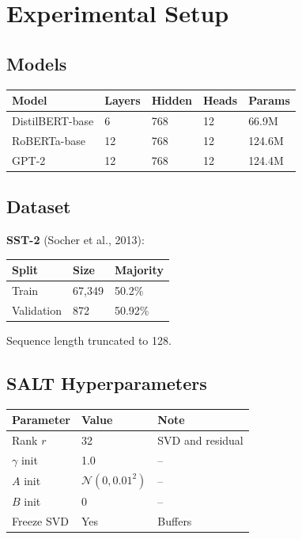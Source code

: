 
\section{Experimental Setup}

\subsection{Models}

\begin{table}[H]
\centering
\small
\begin{tabular}{lllll}
\toprule
\textbf{Model} & \textbf{Layers} & \textbf{Hidden} & \textbf{Heads} & \textbf{Params} \\
\midrule
DistilBERT-base & 6 & 768 & 12 & 66.9M \\
RoBERTa-base & 12 & 768 & 12 & 124.6M \\
GPT-2 & 12 & 768 & 12 & 124.4M \\
\bottomrule
\end{tabular}
\end{table}

\subsection{Dataset}

\textbf{SST-2} (Socher et al., 2013):

\begin{table}[H]
\centering
\small
\begin{tabular}{lll}
\toprule
\textbf{Split} & \textbf{Size} & \textbf{Majority} \\
\midrule
Train & 67,349 & 50.2\% \\
Validation & 872 & 50.92\% \\
\bottomrule
\end{tabular}
\end{table}

Sequence length truncated to 128.

\subsection{SALT Hyperparameters}

\begin{table}[H]
\centering
\small
\begin{tabular}{lll}
\toprule
\textbf{Parameter} & \textbf{Value} & \textbf{Note} \\
\midrule
Rank $r$ & 32 & SVD and residual \\
$\gamma$ init & 1.0 & -- \\
$A$ init & $\mathcal{N}(0, 0.01^2)$ & -- \\
$B$ init & 0 & -- \\
Freeze SVD & Yes & Buffers \\
\bottomrule
\end{tabular}
\end{table}

